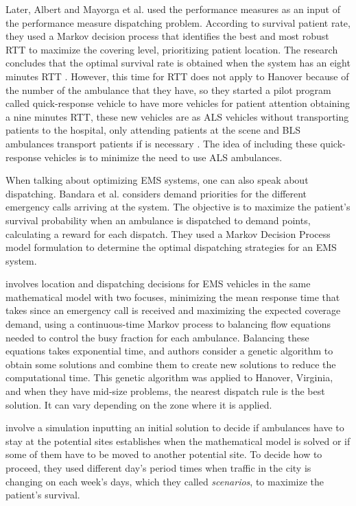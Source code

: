 Later, Albert and Mayorga et al. used the performance measures as an input of the performance measure dispatching problem. According to survival patient rate, they used a Markov decision process that identifies the best and most robust RTT to maximize the covering level, prioritizing patient location. The research concludes that the optimal survival rate is obtained when the system has an eight minutes RTT \cite{mclay2011evaluating}. However, this time for RTT does not apply to Hanover because of the number of the ambulance that they have, so they started a pilot program called quick-response vehicle to have more vehicles for patient attention obtaining a nine minutes RTT, these new vehicles are as ALS vehicles without transporting patients to the hospital, only attending patients at the scene and BLS ambulances transport patients if is necessary \cite{mclay2012hanover}. The idea of including these quick-response vehicles is to minimize the need to use ALS ambulances.

When talking about optimizing EMS systems, one can also speak about dis\-pat\-ching. Bandara et al. \cite{bandara2012optimal} considers demand priorities for the different emergency calls arriving at the system. The objective is to maximize the patient's survival probability when an ambulance is dispatched to demand points, calculating a reward for each dispatch. They used a Markov Decision Process model formulation to determine the optimal dispatching strategies for an EMS system.

\cite{toro2013joint} involves location and dispatching decisions for EMS vehicles in the same mathematical model with two focuses, minimizing the mean response time that takes since an emergency call is received and maximizing the expected coverage demand, using a continuous-time Markov process to balancing flow equations needed to control the busy fraction for each ambulance. Balancing these equations takes exponential time, and authors consider a genetic algorithm to obtain some solutions and combine them to create new solutions to reduce the computational time. This genetic algorithm was applied to Hanover, Virginia, and when they have mid-size problems, the nearest dispatch rule is the best solution. It can vary depending on the zone where it is applied.

\cite{amorim2019traffic} involve a simulation inputting an initial solution to decide if ambulances have to stay at the potential sites establishes when the mathematical model is solved or if some of them have to be moved to another potential site. To decide how to proceed, they used different day's period times when traffic in the city is changing on each week's days, which they called \textit{scenarios}, to maximize the patient's survival. 

